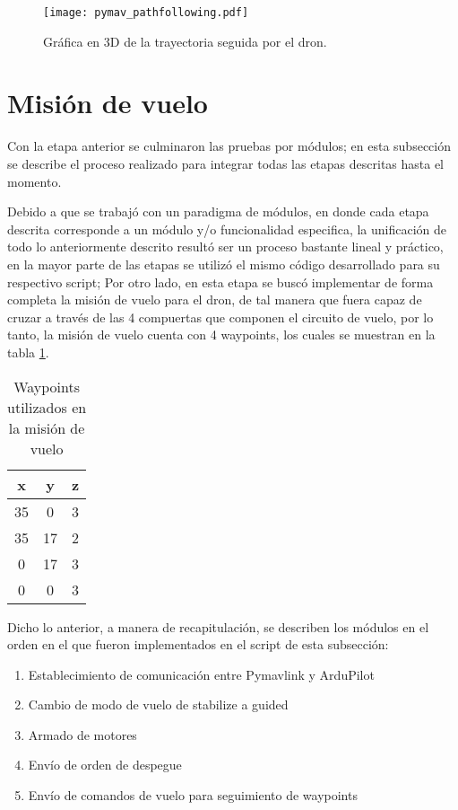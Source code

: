 \begin{figure}[ht]
    \centering
    \texttt{[image: pymav\_pathfollowing.pdf]}
    \caption{Gráfica en 3D de la trayectoria seguida por el dron.}
    \label{fig:pymav_pathfollowing}
\end{figure}

\section{Misión de vuelo}

Con la etapa anterior se culminaron las pruebas por módulos; en esta subsección se describe el proceso realizado para integrar todas las etapas descritas hasta el momento.

Debido a que se trabajó con un paradigma de módulos, en donde cada etapa descrita corresponde a un módulo y/o funcionalidad especifica, la unificación de todo lo anteriormente descrito resultó ser un proceso bastante lineal y práctico, en la mayor parte de las etapas se utilizó el mismo código desarrollado para su respectivo script; Por otro lado, en esta etapa se buscó implementar de forma completa la misión de vuelo para el dron, de tal manera que fuera capaz de cruzar a través de las 4 compuertas que componen el circuito de vuelo, por lo tanto, la misión de vuelo cuenta con 4 waypoints, los cuales se muestran en la tabla \ref{tab:waypoints_mission}.

\begin{table}[ht]
    \centering
    \begin{tabular}{ccc}
        \hline
        x & y & z\\
        \hline
        \hline
        35 & 0 & 3\\
        35 & 17 & 2\\
        0 & 17 & 3\\
        0 & 0 & 3\\
        \hline
        \hline
    \end{tabular}
    \caption{Waypoints utilizados en la misión de vuelo}
    \label{tab:waypoints_mission}
\end{table}


Dicho lo anterior, a manera de recapitulación, se describen los módulos en el orden en el que fueron implementados en el script de esta subsección:

\begin{enumerate}
    \item Establecimiento de comunicación entre Pymavlink y ArduPilot
    \item Cambio de modo de vuelo de stabilize a guided
    \item Armado de motores
    \item Envío de orden de despegue
    \item Envío de comandos de vuelo para seguimiento de waypoints
\end{enumerate}

